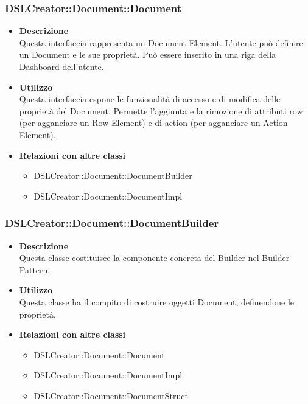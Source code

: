  \subsubsection{DSLCreator::Document::Document}
                    \begin{itemize}
                        \item \textbf{Descrizione} \hfill \\
                            Questa interfaccia rappresenta un Document Element. L'utente può definire un Document e le sue proprietà. Può essere inserito in una riga della Dashboard dell'utente.
                        \item \textbf{Utilizzo} \hfill \\
                            Questa interfaccia espone le funzionalità di accesso e di modifica delle proprietà del Document. Permette l'aggiunta e la rimozione di attributi row (per agganciare un Row Element) e di action (per agganciare un Action Element).
                        \item \textbf{Relazioni con altre classi}
                            \begin{itemize}
                              \item DSLCreator::Document::DocumentBuilder
                              \item DSLCreator::Document::DocumentImpl
                            \end{itemize}
                    \end{itemize}

 \subsubsection{DSLCreator::Document::DocumentBuilder}
                    \begin{itemize}
                        \item \textbf{Descrizione} \hfill \\
                            Questa classe costituisce la componente concreta del Builder nel Builder Pattern.
                        \item \textbf{Utilizzo} \hfill \\
                            Questa classe ha il compito di costruire oggetti Document, definendone le proprietà.
                        \item \textbf{Relazioni con altre classi}
                            \begin{itemize}
                              \item DSLCreator::Document::Document
                              \item DSLCreator::Document::DocumentImpl
                              \item DSLCreator::Document::DocumentStruct
                            \end{itemize}
                    \end{itemize}

